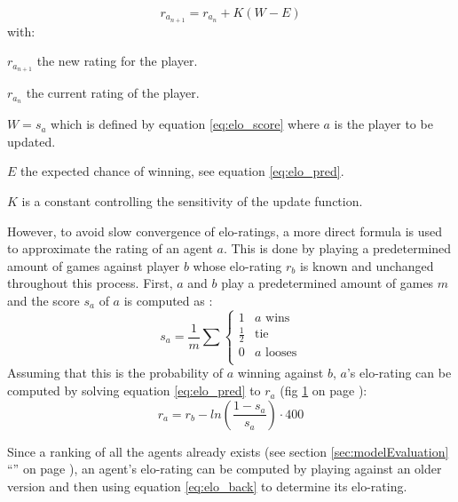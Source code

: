 \documentclass[12pt]{article}
\newcommand{\imgRef}[1]{(fig \ref{#1} on page \pageref{#1})}
\newcommand{\sectionref}[1]{section \ref{#1} ``\nameref{#1}'' on page \pageref{#1}}
\begin{document}
\begin{equation} \label{eq:elo_update}
r_{a_{n+1}} = r_{a_n} + K(W - E)
\end{equation}
with:
\begin{description}
\item \(r_{a_{n+1}}\) the new rating for the player.
\item \(r_{a_n}\) the current rating of the player.
\item \(W = s_a\) which is defined by equation \ref{eq:elo_score} where \(a\) is the player to be updated.
\item \(E\) the expected chance of winning, see equation \ref{eq:elo_pred}.
\item \(K\) is a constant controlling the sensitivity of the update function.
\end{description}
However, to avoid slow convergence of elo-ratings, a more direct formula is used to approximate the rating of an agent \(a\). This is done by playing a predetermined amount of games against player \(b\) whose elo-rating \(r_b\) is known and unchanged throughout this process. First, \(a\) and \(b\) play a predetermined amount of games \(m\) and the score \(s_a\) of \(a\) is computed as \cite{elo1978rating}:
\begin{equation} \label{eq:elo_score}
s_a = \frac{1}{m}\sum\left\{
\begin{array}{ll}
1 &              a\textrm{ wins} \\
\frac{1}{2} & \textrm{tie}\\
0 &              a\textrm{ looses}\\
\end{array}
\right.
\end{equation}
Assuming that this is the probability of \(a\) winning against \(b\), \(a\)'s elo-rating can be computed by solving equation \ref{eq:elo_pred} to \(r_a\) \imgRef{fig:eloInv}:
\begin{equation} \label{eq:elo_back}
r_a = r_b - ln\left(\frac{1-s_a}{s_a}\right) \cdot 400
\end{equation}
\begin{figure}
\center

\label{fig:eloInv}
\end{figure}
Since a ranking of all the agents already exists (see \sectionref{sec:modelEvaluation}), an agent's elo-rating can be computed by playing against an older version and then using equation \ref{eq:elo_back} to determine its elo-rating. 
\end{document}
